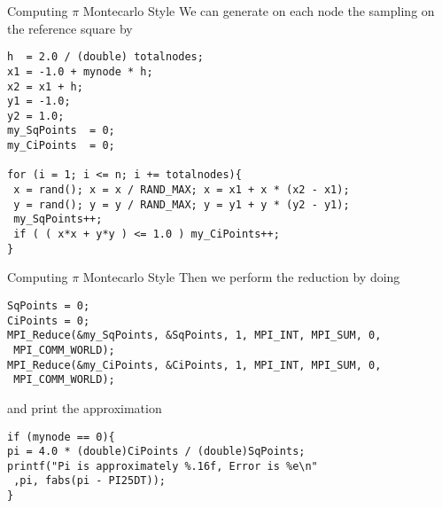 \documentclass[xcolor={svgnames,usenames}]{beamer}
\begin{document}
\begin{frame}[fragile]{Computing $\pi$ Montecarlo Style}
We can generate on each node the sampling on the reference square by
\begin{verbatim}
h  = 2.0 / (double) totalnodes;
x1 = -1.0 + mynode * h;
x2 = x1 + h;
y1 = -1.0;
y2 = 1.0;
my_SqPoints  = 0;
my_CiPoints  = 0;

for (i = 1; i <= n; i += totalnodes){
 x = rand(); x = x / RAND_MAX; x = x1 + x * (x2 - x1);
 y = rand(); y = y / RAND_MAX; y = y1 + y * (y2 - y1);
 my_SqPoints++;
 if ( ( x*x + y*y ) <= 1.0 ) my_CiPoints++;
}
\end{verbatim}
\end{frame}

\begin{frame}[fragile]{Computing $\pi$ Montecarlo Style}
\small
Then we perform the reduction by doing
\begin{verbatim}
SqPoints = 0;
CiPoints = 0;
MPI_Reduce(&my_SqPoints, &SqPoints, 1, MPI_INT, MPI_SUM, 0,
 MPI_COMM_WORLD);
MPI_Reduce(&my_CiPoints, &CiPoints, 1, MPI_INT, MPI_SUM, 0,
 MPI_COMM_WORLD);
\end{verbatim}
and print the approximation
\begin{verbatim}
if (mynode == 0){
pi = 4.0 * (double)CiPoints / (double)SqPoints;
printf("Pi is approximately %.16f, Error is %e\n"
 ,pi, fabs(pi - PI25DT));
}
\end{verbatim}
\end{frame}
	
\end{document}
